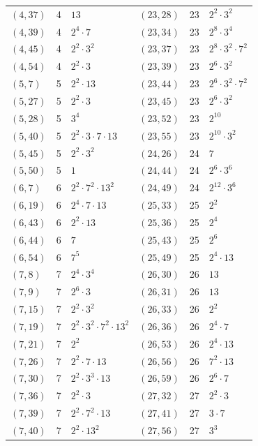 \documentclass[11pt]{article}
\begin{document}
\begin{longtable}{@{}lrl@{\qquad}lrl@{}}
$(4,37)$ & 4 & $13$ & $(23,28)$ & 23 & $2^{2}\cdot 3^{2}$\\
$(4,39)$ & 4 & $2^{4}\cdot 7$ & $(23,34)$ & 23 & $2^{8}\cdot 3^{4}$\\
$(4,45)$ & 4 & $2^{2}\cdot 3^{2}$ & $(23,37)$ & 23 & $2^{8}\cdot 3^{2}\cdot 7^{2}$\\
$(4,54)$ & 4 & $2^{2}\cdot 3$ & $(23,39)$ & 23 & $2^{6}\cdot 3^{2}$\\
$(5,7)$ & 5 & $2^{2}\cdot 13$ & $(23,44)$ & 23 & $2^{6}\cdot 3^{2}\cdot 7^{2}$\\
$(5,27)$ & 5 & $2^{2}\cdot 3$ & $(23,45)$ & 23 & $2^{6}\cdot 3^{2}$\\
$(5,28)$ & 5 & $3^{4}$ & $(23,52)$ & 23 & $2^{10}$\\
$(5,40)$ & 5 & $2^{2}\cdot 3\cdot 7\cdot 13$ & $(23,55)$ & 23 & $2^{10}\cdot 3^{2}$\\
$(5,45)$ & 5 & $2^{2}\cdot 3^{2}$ & $(24,26)$ & 24 & $7$\\
$(5,50)$ & 5 & $1$ & $(24,44)$ & 24 & $2^{6}\cdot 3^{6}$\\
$(6,7)$ & 6 & $2^{2}\cdot 7^{2}\cdot 13^{2}$ & $(24,49)$ & 24 & $2^{12}\cdot 3^{6}$\\
$(6,19)$ & 6 & $2^{4}\cdot 7\cdot 13$ & $(25,33)$ & 25 & $2^{2}$\\
$(6,43)$ & 6 & $2^{2}\cdot 13$ & $(25,36)$ & 25 & $2^{4}$\\
$(6,44)$ & 6 & $7$ & $(25,43)$ & 25 & $2^{6}$\\
$(6,54)$ & 6 & $7^{5}$ & $(25,49)$ & 25 & $2^{4}\cdot 13$\\
$(7,8)$ & 7 & $2^{4}\cdot 3^{4}$ & $(26,30)$ & 26 & $13$\\
$(7,9)$ & 7 & $2^{6}\cdot 3$ & $(26,31)$ & 26 & $13$\\
$(7,15)$ & 7 & $2^{2}\cdot 3^{2}$ & $(26,33)$ & 26 & $2^{2}$\\
$(7,19)$ & 7 & $2^{2}\cdot 3^{2}\cdot 7^{2}\cdot 13^{2}$ & $(26,36)$ & 26 & $2^{4}\cdot 7$\\
$(7,21)$ & 7 & $2^{2}$ & $(26,53)$ & 26 & $2^{4}\cdot 13$\\
$(7,26)$ & 7 & $2^{2}\cdot 7\cdot 13$ & $(26,56)$ & 26 & $7^{2}\cdot 13$\\
$(7,30)$ & 7 & $2^{2}\cdot 3^{3}\cdot 13$ & $(26,59)$ & 26 & $2^{6}\cdot 7$\\
$(7,36)$ & 7 & $2^{2}\cdot 3$ & $(27,32)$ & 27 & $2^{2}\cdot 3$\\
$(7,39)$ & 7 & $2^{2}\cdot 7^{2}\cdot 13$ & $(27,41)$ & 27 & $3\cdot 7$\\
$(7,40)$ & 7 & $2^{2}\cdot 13^{2}$ & $(27,56)$ & 27 & $3^{3}$\\

\end{longtable}
\end{document}

